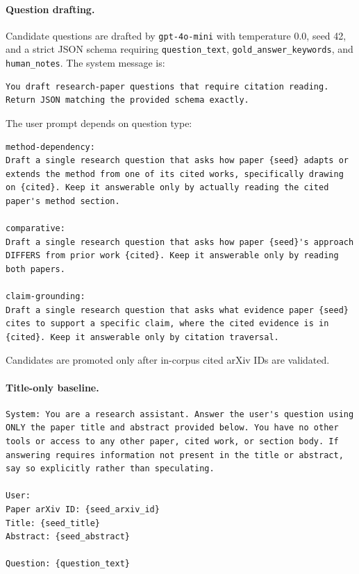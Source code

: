 \documentclass[10pt]{article}
\begin{document}
\paragraph{Question drafting.}
Candidate questions are drafted by \texttt{gpt-4o-mini} with temperature 0.0, seed 42, and a strict JSON schema requiring \texttt{question\_text}, \texttt{gold\_answer\_keywords}, and \texttt{human\_notes}. The system message is:
\begin{lstlisting}[style=terminal]
You draft research-paper questions that require citation reading. Return JSON matching the provided schema exactly.
\end{lstlisting}
The user prompt depends on question type:
\begin{lstlisting}[style=terminal]
method-dependency:
Draft a single research question that asks how paper {seed} adapts or extends the method from one of its cited works, specifically drawing on {cited}. Keep it answerable only by actually reading the cited paper's method section.

comparative:
Draft a single research question that asks how paper {seed}'s approach DIFFERS from prior work {cited}. Keep it answerable only by reading both papers.

claim-grounding:
Draft a single research question that asks what evidence paper {seed} cites to support a specific claim, where the cited evidence is in {cited}. Keep it answerable only by citation traversal.
\end{lstlisting}
Candidates are promoted only after in-corpus cited arXiv IDs are validated.

\paragraph{Title-only baseline.}
\begin{lstlisting}[style=terminal]
System: You are a research assistant. Answer the user's question using ONLY the paper title and abstract provided below. You have no other tools or access to any other paper, cited work, or section body. If answering requires information not present in the title or abstract, say so explicitly rather than speculating.

User:
Paper arXiv ID: {seed_arxiv_id}
Title: {seed_title}
Abstract: {seed_abstract}

Question: {question_text}
\end{lstlisting}
\end{document}
